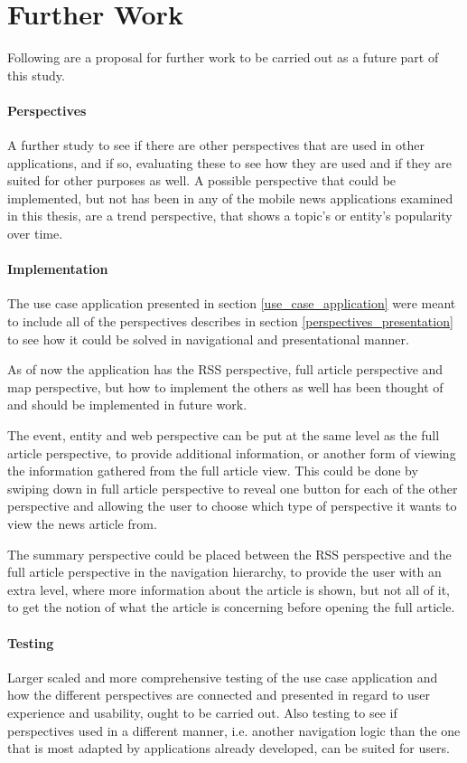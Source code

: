 \chapter{Further Work}
\label{further_work}

Following are a proposal for further work to be carried out as a future part of this study.

\subsubsection{Perspectives}
A further study to see if there are other perspectives that are used in other applications, and if so, evaluating these to see how they are used and if they are suited for other purposes as well. A possible perspective that could be implemented, but not has been in any of the mobile news applications examined in this thesis, are a trend perspective, that shows a topic's or entity's popularity over time.


\subsubsection{Implementation}
The use case application presented in section \ref{use_case_application} were meant to include all of the perspectives describes in section \ref{perspectives_presentation} to see how it could be solved in navigational and presentational manner. 

As of now the application has the RSS perspective, full article perspective and map perspective, but how to implement the others as well has been thought of and should be implemented in future work. 

The event, entity and web perspective can be put at the same level as the full article perspective, to provide additional information, or another form of viewing the information gathered from the full article view. This could be done by swiping down in full article perspective to reveal one button for each of the other perspective and allowing the user to choose which type of perspective it wants to view the news article from.

The summary perspective could be placed between the RSS perspective and the full article perspective in the navigation hierarchy, to provide the user with an extra level, where more information about the article is shown, but not all of it, to get the notion of what the article is concerning before opening the full article.

\subsubsection{Testing}
Larger scaled and more comprehensive testing of the use case application and how the different perspectives are connected and presented in regard to user experience and usability, ought to be carried out. Also testing to see if perspectives used in a different manner, i.e. another navigation logic than the one that is most adapted by applications already developed, can be suited for users.


